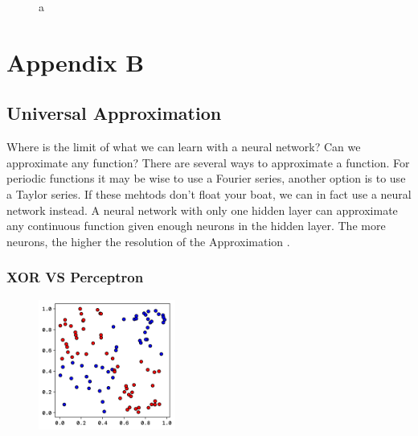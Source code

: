 \documentclass[twoside,11pt]{report}
\begin{document}
\begin{figure}[!ht]
\begin{minipage}[t]{0.5\textwidth - 1mm}
\begin{center}
            \end{center}
            \caption
            {
                a
            }\label{fig:perlinNoise_NN_pred}
        \end{minipage}
    \end{figure}











\chapter*{Appendix B}
\label{app:appendixB}


\section{Universal Approximation}
\label{sec:UAT}

    Where is the limit of what we can learn with a neural network? Can we approximate any function?
    There are several ways to approximate a function. For periodic functions it may be wise to use a Fourier series,
    another option is to use a Taylor series. If these mehtods don't float your boat, we can in fact use a neural network
    instead. A neural network with only one hidden layer can approximate any continuous function
    given enough neurons in the hidden layer. The more neurons, the higher the resolution of the Approximation
    \cite{HornikEtAl89}. 

\subsection*{XOR VS Perceptron}
\label{app:xor}

    \begin{figure}
        \begin{center}
            \includegraphics[width=0.4\textwidth]{../runsAndFigures/xor.png}
        \end{center}
        \caption{}\label{fig:xor_data}
    \end{figure}
\end{document}
